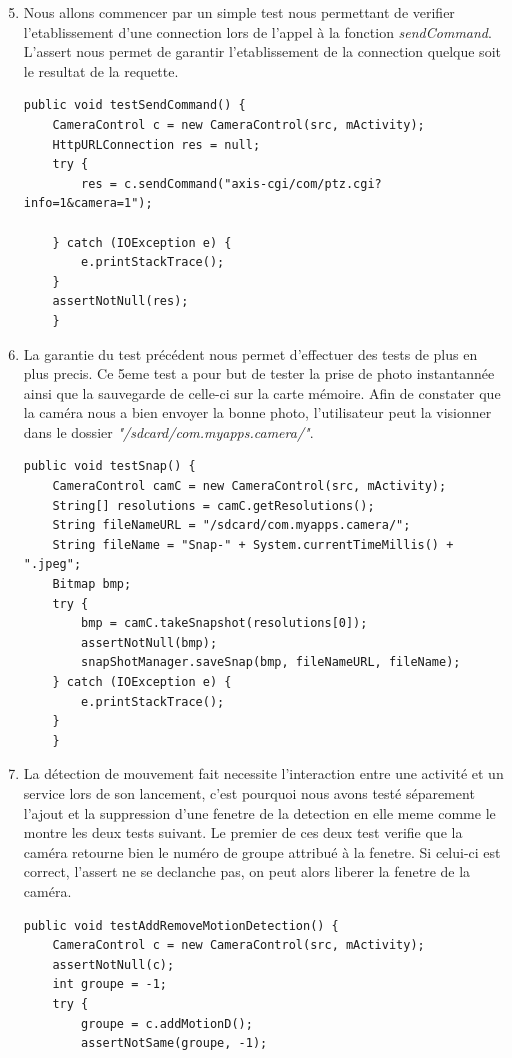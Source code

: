 \begin{enumerate}
  \setcounter{enumi}{4}
  \item Nous allons commencer par un simple test nous permettant de verifier l'etablissement d'une connection lors de l'appel à la fonction \textit{sendCommand}. L'assert nous permet de garantir l'etablissement de la connection quelque soit le resultat de la requette.
\begin{lstlisting}[format=JAVA,caption={Test 4 : Connection HTTP}]
   public void testSendCommand() {
	CameraControl c = new CameraControl(src, mActivity);
	HttpURLConnection res = null;
	try {
	    res = c.sendCommand("axis-cgi/com/ptz.cgi?info=1&camera=1");

	} catch (IOException e) {
	    e.printStackTrace();
	}
	assertNotNull(res);
    }
\end{lstlisting}

\item La garantie du test précédent nous permet d'effectuer des tests de plus en plus precis. Ce 5eme test a pour but de tester la prise de photo instantannée ainsi que la sauvegarde de celle-ci sur la carte mémoire. Afin de constater que la caméra nous a bien envoyer la bonne photo, l'utilisateur peut la visionner dans le dossier \textit{"/sdcard/com.myapps.camera/"}.
\begin{lstlisting}[format=JAVA,caption={Test 5 : SnapShot et sauvegarde}]
 public void testSnap() {
	CameraControl camC = new CameraControl(src, mActivity);
	String[] resolutions = camC.getResolutions();
	String fileNameURL = "/sdcard/com.myapps.camera/";
	String fileName = "Snap-" + System.currentTimeMillis() + ".jpeg";
	Bitmap bmp;
	try {
	    bmp = camC.takeSnapshot(resolutions[0]);
	    assertNotNull(bmp);
	    snapShotManager.saveSnap(bmp, fileNameURL, fileName);
	} catch (IOException e) {
	    e.printStackTrace();
	}
    }
\end{lstlisting}

\item La détection de mouvement fait necessite l'interaction entre une activité et un service lors de son lancement, c'est pourquoi nous avons testé séparement l'ajout et la suppression d'une fenetre de la detection en elle meme comme le montre les deux tests suivant. Le premier de ces deux test verifie que la caméra retourne bien le numéro de groupe attribué à la fenetre. Si celui-ci est correct, l'assert ne se declanche pas, on peut alors liberer la fenetre de la caméra.
\begin{lstlisting}[format=JAVA,caption={Test 6 : Ajout et suppression d'une fenetre}]
 public void testAddRemoveMotionDetection() {
	CameraControl c = new CameraControl(src, mActivity);
	assertNotNull(c);
	int groupe = -1;
	try {
	    groupe = c.addMotionD();
	    assertNotSame(groupe, -1);


\end{lstlisting}
\end{enumerate}
